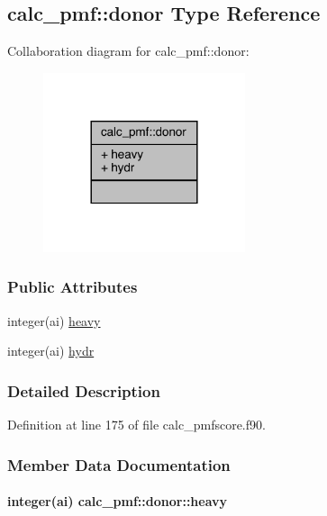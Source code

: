 \hypertarget{structcalc__pmf_1_1donor}{\subsection{calc\-\_\-pmf\-:\-:donor Type Reference}
\label{structcalc__pmf_1_1donor}
}


Collaboration diagram for calc\-\_\-pmf\-:\-:donor\-:
\nopagebreak
\begin{figure}[H]
\begin{center}
\leavevmode
\includegraphics[width=168pt]{structcalc__pmf_1_1donor__coll__graph}
\end{center}
\end{figure}
\subsubsection*{Public Attributes}
\begin{DoxyCompactItemize}
\item 
integer(ai) \hyperlink{structcalc__pmf_1_1donor_a1d1c1e3814864fddb6100464a1b2de6b}{heavy}
\item 
integer(ai) \hyperlink{structcalc__pmf_1_1donor_aa574638324f14dc13d08c5494590a36e}{hydr}
\end{DoxyCompactItemize}


\subsubsection{Detailed Description}


Definition at line 175 of file calc\-\_\-pmfscore.\-f90.



\subsubsection{Member Data Documentation}
\hypertarget{structcalc__pmf_1_1donor_a1d1c1e3814864fddb6100464a1b2de6b}{
\paragraph[{heavy}]{\setlength{\rightskip}{0pt plus 5cm}integer(ai) calc\-\_\-pmf\-::donor\-::heavy}}\label{structcalc__pmf_1_1donor_a1d1c1e3814864fddb6100464a1b2de6b}



